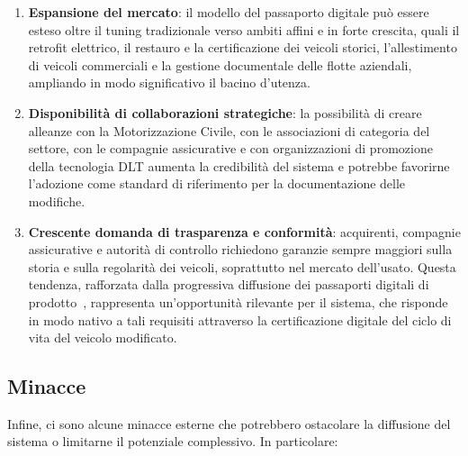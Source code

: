 \begin{enumerate}
    \item \textbf{Espansione del mercato}: il modello del passaporto digitale può essere esteso oltre il tuning tradizionale verso ambiti affini e in forte crescita, quali il retrofit elettrico, il restauro e la certificazione dei veicoli storici, l'allestimento di veicoli commerciali e la gestione documentale delle flotte aziendali, ampliando in modo significativo il bacino d'utenza.

    \item \textbf{Disponibilità di collaborazioni strategiche}: la possibilità di creare alleanze con la Motorizzazione Civile, con le associazioni di categoria del settore, con le compagnie assicurative e con organizzazioni di promozione della tecnologia DLT aumenta la credibilità del sistema e potrebbe favorirne l'adozione come standard di riferimento per la documentazione delle modifiche.

    \item \textbf{Crescente domanda di trasparenza e conformità}: acquirenti, compagnie assicurative e autorità di controllo richiedono garanzie sempre maggiori sulla storia e sulla regolarità dei veicoli, soprattutto nel mercato dell'usato. Questa tendenza, rafforzata dalla progressiva diffusione dei passaporti digitali di prodotto~\cite{espr}, rappresenta un'opportunità rilevante per il sistema, che risponde in modo nativo a tali requisiti attraverso la certificazione digitale del ciclo di vita del veicolo modificato.
\end{enumerate}

\subsection*{Minacce}
Infine, ci sono alcune minacce esterne che potrebbero ostacolare la diffusione del sistema o limitarne il potenziale complessivo. In particolare:

